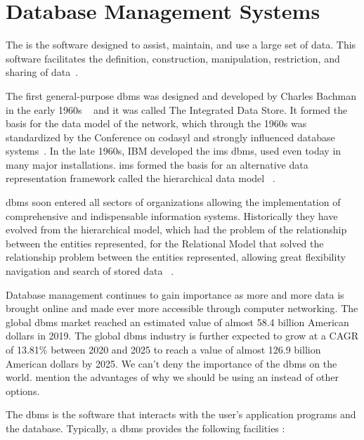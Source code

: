 \section{Database Management Systems}
\label{sc:DBMS}


The  is the software designed to assist, maintain, and use a large set of data. This software facilitates the definition, construction, manipulation, restriction, and sharing of data~\cite{gehrke_2002}. 

The first general-purpose \gls{dbms} was designed and developed by Charles Bachman in the early 1960s ~\cite{haigh2016charles} and it was called The Integrated Data Store. It formed the basis for the data model of the network, which through the 1960s was standardized by the Conference on \gls{codasyl} and strongly influenced database systems~\cite{gehrke_2002,haigh2016charles}.
In the late 1960s, IBM developed the \gls{ims} \gls{dbms}, used even today in many major installations. \gls{ims} formed the basis for an alternative data representation framework called the hierarchical data model ~\cite{gehrke_2002}. 

\gls{dbms} soon entered all sectors of organizations allowing the implementation of comprehensive and indispensable information systems. Historically they have evolved from the hierarchical model, which had the problem of the relationship between the entities represented, for the Relational Model that solved the relationship problem between the entities represented, allowing great flexibility navigation and search of stored data ~\cite{gehrke_2002}.

Database management continues to gain importance as more and more data is
brought online and made ever more accessible through computer networking. The global \gls{dbms} market reached an estimated value of almost 58.4 billion American dollars in 2019. The global \gls{dbms} industry is further expected to grow at a CAGR of 13.81\% between 2020 and 2025 to reach a value of almost 126.9 billion American dollars by 2025. We can't deny the importance of the \gls{dbms} on the world. mention the advantages of why we should be using an instead of other options.

The \gls{dbms} is the software that interacts with the user's application programs and the database. Typically, a \gls{dbms} provides the following facilities \cite{begg}:

